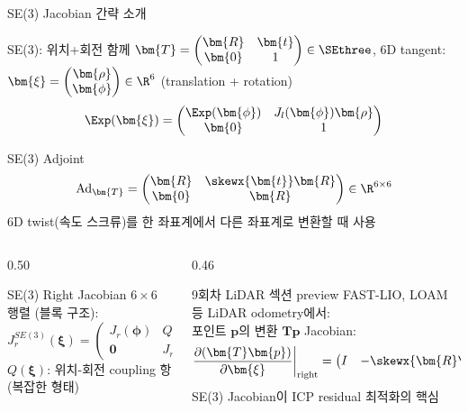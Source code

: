 \begin{frame}[shrink=5]{SE(3) Jacobian 간략 소개}
  \begin{block}{SE(3): 위치+회전 함께}
    $\bm{T} = \begin{pmatrix}\bm{R} & \bm{t} \\ \bm{0} & 1\end{pmatrix} \in \SEthree$,\quad
    6D tangent: $\bm{\xi} = \begin{pmatrix}\bm{\rho} \\ \bm{\phi}\end{pmatrix} \in \R^6$ (translation + rotation)
    \[
      \Exp(\bm{\xi}) = \begin{pmatrix} \Exp(\bm{\phi}) & J_l(\bm{\phi})\bm{\rho} \\ \bm{0} & 1 \end{pmatrix}
    \]
  \end{block}
  \pause
  \begin{alertblock}{SE(3) Adjoint}
    \[
      \mathrm{Ad}_{\bm{T}} = \begin{pmatrix} \bm{R} & \skewx{\bm{t}}\bm{R} \\ \bm{0} & \bm{R} \end{pmatrix} \in \R^{6\times 6}
    \]
    6D twist(속도 스크류)를 한 좌표계에서 다른 좌표계로 변환할 때 사용
  \end{alertblock}
  \pause
  \begin{columns}[T]
    \begin{column}{0.50\textwidth}
      \begin{block}{SE(3) Right Jacobian}
        $6\times 6$ 행렬 (블록 구조):
        \[
          J_r^{SE(3)}(\bm{\xi}) = \begin{pmatrix} J_r(\bm{\phi}) & Q(\bm{\xi}) \\ \bm{0} & J_r(\bm{\phi}) \end{pmatrix}
        \]
        $Q(\bm{\xi})$: 위치-회전 coupling 항 (복잡한 형태)
      \end{block}
    \end{column}
    \begin{column}{0.46\textwidth}
      \begin{exampleblock}{9회차 LiDAR 섹션 preview}
        FAST-LIO, LOAM 등 LiDAR odometry에서:\\
        \medskip
        포인트 $\bm{p}$의 변환 $\bm{T}\bm{p}$ Jacobian:\\
        \[
          \frac{\partial(\bm{T}\bm{p})}{\partial\bm{\xi}}\bigg|_{\text{right}} = \begin{pmatrix} I & -\skewx{\bm{R}\bm{p}+\bm{t}} \end{pmatrix}
        \]
        SE(3) Jacobian이 ICP residual 최적화의 핵심
      \end{exampleblock}
    \end{column}
  \end{columns}
\end{frame}


